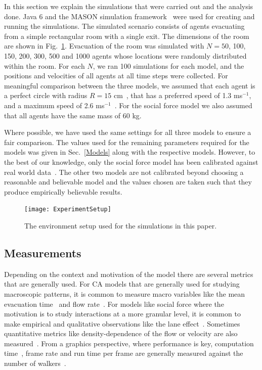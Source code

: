 In this section we explain the simulations that were carried out and the analysis done. Java 6 and the MASON simulation framework~\cite{Luke:2005wc} were used for creating and running the simulations. The simulated scenario consists of agents evacuating from a simple rectangular room with a single exit. The dimensions of the room are shown in Fig.~\ref{fig:experimentalSetup}. Evacuation of the room was simulated with $N = 50$, 100, 150, 200, 300, 500 and 1000 agents whose locations were randomly distributed within the room. For each $N$, we ran 100 simulations for each model, and the positions and velocities of all agents at all time steps were collected. For meaningful comparison between the three models, we assumed that each agent is a perfect circle with radius $R = 15$ cm~\cite{Pan:2006vp}, that has a preferred speed of 1.3 ms$^{-1}$, and a maximum speed of 2.6 ms$^{-1}$~\cite{fruin1992designing}. For the social force model we also assumed that all agents have the same mass of 60 kg.

Where possible, we have used the same settings for all three models to ensure a fair comparison. The values used for the remaining parameters required for the models was given in Sec.~\ref{Models} along with the respective models. However, to the best of our knowledge, only the social force model has been calibrated against real world data~\cite{Bauer2011}. The other two models are not calibrated beyond choosing a reasonable and believable model and the values chosen are taken such that they produce empirically believable results.


\begin{figure}[htbp]
\texttt{[image: ExperimentSetup]}
\caption{The environment setup used for the simulations in this paper.}
\label{fig:experimentalSetup}
\end{figure}

\subsection{Measurements}

Depending on the context and motivation of the model there are several metrics that are generally used. For CA models that are generally used for studying macroscopic patterns, it is common to measure macro variables like the mean evacuation time~\cite{Nagai:2004kl} and flow rate~\cite{Tajima:2001to}. For models like social force where the motivation is to study interactions at a more granular level, it is common to make empirical and qualitative observations like the lane effect~\cite{PhysRevE.51.4282}. Sometimes quantitative metrics like density-dependence of the flow or velocity are also measured~\cite{Seyfried2008}. From a graphics perspective, where performance is key, computation time~\cite{Ondrej:2010hv}, frame rate and run time per frame are generally measured against the number of walkers~\cite{vandenBerg:2008fu}.

